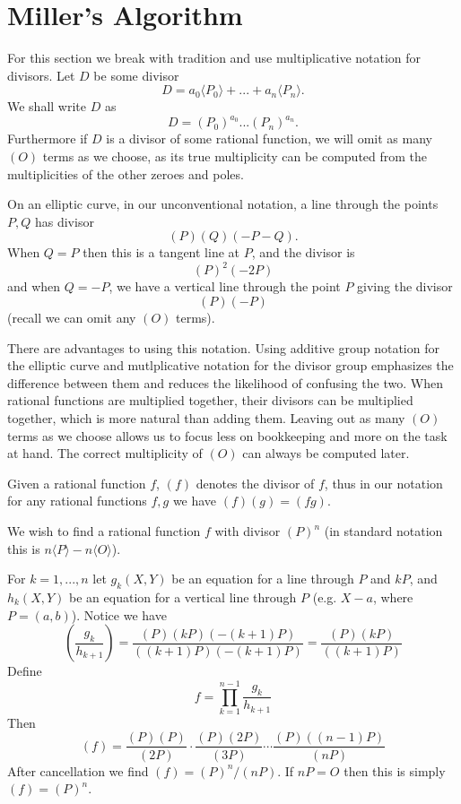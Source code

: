 \chapter {Miller's Algorithm}

For this section we break with tradition and use multiplicative
notation for divisors. Let $D$ be some divisor
\[ D = a_0\langle P_0\rangle + ... + a_n \langle P_n\rangle . \]
We shall write $D$ as
\[ D = (P_0)^{a_0} ... (P_n)^{a_n} . \]
Furthermore if $D$ is a divisor of some rational function, we will
omit as many $(O)$ terms as we choose, as its true multiplicity
can be computed from the multiplicities of the other zeroes and poles.

On an elliptic curve, in our unconventional notation,
a line through the points $P, Q$ has divisor
\[ (P)(Q)(-P-Q) . \]
When $Q = P$ then this is a tangent line at $P$, and the divisor is
\[ (P)^2 (-2P) \]
and when $Q = -P$, we have a vertical line through the point $P$
giving the divisor
\[ (P)(-P) \]
(recall we can omit any $(O)$ terms).

There are advantages to using this notation. Using additive group
notation for the elliptic curve and mutlplicative notation for the divisor
group emphasizes the difference between them and reduces the likelihood of
confusing the two. When rational functions are multiplied together,
their divisors can be multiplied together, which is more natural than adding
them. Leaving out as many $(O)$ terms as we choose allows us to focus less on
bookkeeping and more on the task at hand.
The correct multiplicity of $(O)$ can always be computed later.

Given a rational function $f$,
$(f)$ denotes the divisor of $f$, thus in our notation
for any rational functions $f, g$ we have $(f)(g) = (f g)$.

We wish to find a rational function $f$ with divisor
$(P)^n$ (in standard notation this is $n\langle P\rangle  - n\langle O\rangle$).

For $k = 1,...,n$
let $g_k(X,Y)$ be an equation for a line through $P$ and $kP$,
and $h_k(X,Y)$ be an equation for a vertical line through $P$ (e.g.
$X - a$, where $P = (a, b)$). Notice we have
\[
\left (
\frac{g_k}{h_{k+1}}
\right )
= \frac{(P)(kP)(-(k+1)P)}{((k+1)P)(-(k+1)P)}
= \frac{(P)(kP)}{((k+1)P)}
\]
Define
\[ f = \prod_{k=1}^{n-1} \frac{g_k}{h_{k+1}} \]
Then
\[ (f) =
\frac{(P)(P)}{(2P)}
\cdot
\frac{(P)(2P)}{(3P)}
\cdots
\frac{(P)((n-1)P)}{(nP)}
\]
After cancellation we find $(f) = (P)^n / (nP)$. If $nP = O$ then this
is simply $(f) = (P)^n$.
